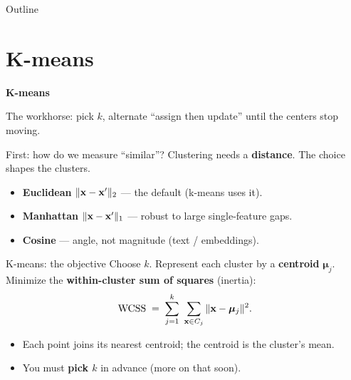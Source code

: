 \documentclass[aspectratio=169]{beamer}
\newcommand{\sectiontransition}[2]{%
  \begin{frame}[plain]
    \vfill
    \begin{center}
      {\Large\color{popblue}\textbf{#1}}\\[0.9em]
      \begin{minipage}{0.82\textwidth}\centering\small #2 \end{minipage}
    \end{center}
    \vfill
  \end{frame}}
\begin{document}
\begin{frame}{Outline}
  \tableofcontents
\end{frame}

\section{K-means}
\sectiontransition{K-means}{The workhorse: pick $k$, alternate ``assign then update'' until the
centers stop moving.}

\begin{frame}{First: how do we measure ``similar''?}
  Clustering needs a \textbf{distance}. The choice shapes the clusters.
  \begin{itemize}\small
    \item \textbf{Euclidean} $\|\mathbf{x}-\mathbf{x}'\|_2$ --- the default (k-means uses it).
    \item \textbf{Manhattan} $\|\mathbf{x}-\mathbf{x}'\|_1$ --- robust to large single-feature gaps.
    \item \textbf{Cosine} --- angle, not magnitude (text / embeddings).
  \end{itemize}
  \vfill
\end{frame}

\begin{frame}{K-means: the objective}
  Choose $k$. Represent each cluster by a \textbf{centroid} $\bm{\mu}_j$. Minimize the
  \textbf{within-cluster sum of squares} (inertia):
  \[
    \text{WCSS} \;=\; \sum_{j=1}^{k}\ \sum_{\mathbf{x} \in C_j} \|\mathbf{x} - \bm{\mu}_j\|^2 .
  \]
  \begin{itemize}\small
    \item Each point joins its nearest centroid; the centroid is the cluster's mean.
    \item You must \textbf{pick $k$} in advance (more on that soon).
  \end{itemize}
  \vfill
\end{frame}
\end{document}
